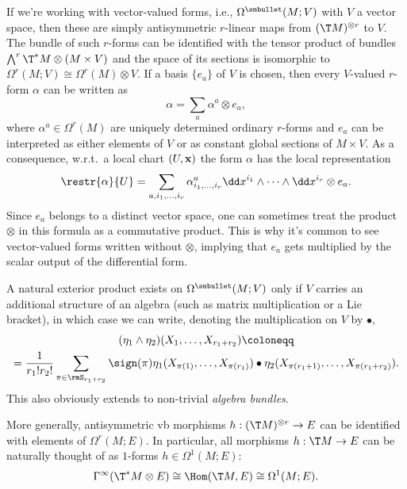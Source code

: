 \begin{example}
    If we're working with vector-valued forms, i.e., $\Omega^{\smbullet }(M;V)$ with $V$ a vector space, then these are simply antisymmetric $r$-linear maps from $(\T M)^{\otimes r}$ to $V$. The bundle of such $r$-forms can be identified with the tensor product of bundles $\bigwedge\nolimits^r \T^\ast M\otimes (M\times V)$ and the space of its sections is isomorphic to $\Omega^r(M;V)\cong \Omega^r(M)\otimes V$. If a basis $\{e_a\}$ of $V$ is chosen, then every $V$-valued $r$-form $\alpha$ can be written as
    \[\alpha=\sum_a \alpha^a\otimes e_a,\]
    where $\alpha^a\in \Omega^r(M)$ are uniquely determined ordinary $r$-forms and $e_a$ can be interpreted as either elements of $V$ or as constant global sections of $M\times V$. As a consequence, w.r.t.\ a local chart $(U,\bf{x})$ the form $\alpha$ has the local representation
    \[\restr{\alpha}{U}=\sum_{a,i_1,\ldots,i_r}\alpha^a_{i_1,\ldots,i_r}\dd x^{i_1}\wedge\cdots\wedge\dd x^{i_r}\otimes e_a.\]
    Since $e_a$ belongs to a distinct vector space, one can sometimes treat the product $\otimes$ in this formula as a commutative product. This is why it's common to see vector-valued forms written without $\otimes$, implying that $e_a$ gets multiplied by the scalar output of the differential form.

    A natural exterior product exists on $\Omega^{\smbullet }(M;V)$ only if $V$ carries an additional structure of an algebra (such as matrix multiplication or a Lie bracket), in which case we can write, denoting the multiplication on $V$ by $\bullet$,
    \begin{multline}
        (\eta_1\wedge\eta_2)(X_1,\ldots,X_{r_1+r_2})\coloneqq \\
        =\frac{1}{r_1!r_2!}\sum_{\pi\in \rmS_{r_1+r_2}}\sign(\pi)\eta_1(X_{\pi(1)},\ldots,X_{\pi(r_1)})\bullet \eta_2(X_{\pi(r_1+1)},\ldots,X_{\pi(r_1+r_2)}).\label{eq 2.4.17 RS1}
    \end{multline}
    This also obviously extends to non-trivial \emph{algebra bundles}.
\end{example}

\begin{example}
    More generally, antisymmetric \gls{vb} morphisms $h:(\T M)^{\otimes r}\to E$ can be identified with elements of $\Omega^r(M;E)$. In particular, all morphisms $h:\T M\to E$ can be naturally thought of as $1$-forms $h\in\Omega^1(M;E)$:
    \[\Gamma^\infty(\T^\ast M\otimes E)\cong \Hom(\T M,E)\cong \Omega^1(M;E).\]
\end{example}


